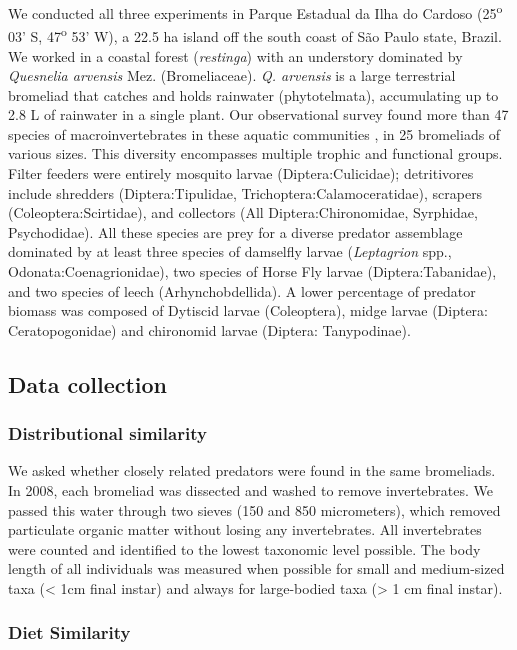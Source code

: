 We conducted all three experiments in Parque Estadual da Ilha do Cardoso
(25\textsuperscript{o} 03' S, 47\textsuperscript{o} 53' W), a 22.5 ha
island off the south coast of S\~ao Paulo state, Brazil. We worked in a
coastal forest (\emph{restinga}) with an understory dominated by
\emph{Quesnelia arvensis} Mez. (Bromeliaceae). \emph{Q. arvensis} is a
large terrestrial bromeliad that catches and holds rainwater
(phytotelmata), accumulating up to 2.8 L of rainwater in a single plant.
Our observational survey found more than 47 species of
macroinvertebrates in these aquatic communities \citep{Romero2010}, in
25 bromeliads of various sizes. This diversity encompasses multiple
trophic and functional groups. Filter feeders were entirely mosquito
larvae (Diptera:Culicidae); detritivores include shredders
(Diptera:Tipulidae, Trichoptera:Calamoceratidae), scrapers
(Coleoptera:Scirtidae), and collectors (All Diptera:Chironomidae,
Syrphidae, Psychodidae). All these species are prey for a diverse
predator assemblage dominated by at least three species of damselfly
larvae (\emph{Leptagrion} spp., Odonata:Coenagrionidae), two species of
Horse Fly larvae (Diptera:Tabanidae), and two species of leech
(Arhynchobdellida). A lower percentage of predator biomass was composed
of Dytiscid larvae (Coleoptera), midge larvae (Diptera: Ceratopogonidae)
and chironomid larvae (Diptera: Tanypodinae).

\subsection{Data collection}\label{data-collection}

\subsubsection{Distributional
similarity}\label{distributional-similarity}

We asked whether closely related predators were found in the same
bromeliads. In 2008, each bromeliad was dissected and washed to remove
invertebrates. We passed this water through two sieves (150 and 850 micrometers),
which removed particulate organic matter without losing any
invertebrates. All invertebrates were counted and identified to the
lowest taxonomic level possible. The body length of all individuals was
measured when possible for small and medium-sized taxa (\textless{} 1cm
final instar) and always for large-bodied taxa (\textgreater{} 1 cm
final instar).

\subsubsection{Diet Similarity}\label{diet-similarity}

